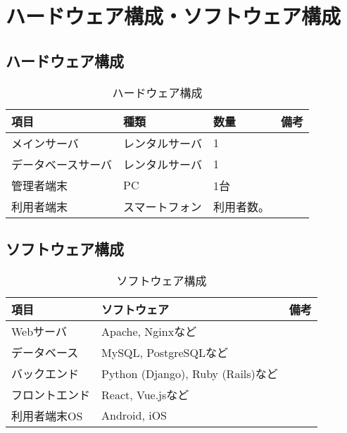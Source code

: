 \documentclass{docs}
\begin{document}
\section{ハードウェア構成・ソフトウェア構成}
\subsection{ハードウェア構成}
\begin{table}[H]
	\centering
	\caption{ハードウェア構成}
	\label{tab:hardware}
	\begin{tabularx}{0.9\textwidth}{|l|X|X|X|}
		\hline
		\textbf{項目} & \textbf{種類} & \textbf{数量} & \textbf{備考} \\ \hline
		メインサーバ & レンタルサーバ & 1 & \\ \hline
		データベースサーバ & レンタルサーバ & 1 & \\ \hline
		管理者端末 & PC & 1台 & \\ \hline
		利用者端末 & スマートフォン & 利用者数。 & \\ \hline
	\end{tabularx}
\end{table}

\subsection{ソフトウェア構成}
\begin{table}[H]
	\centering
	\caption{ソフトウェア構成}
	\label{tab:software}
	\begin{tabularx}{0.9\textwidth}{|l|X|X|}
		\hline
		\textbf{項目} & \textbf{ソフトウェア} & \textbf{備考} \\ \hline
		Webサーバ & Apache, Nginxなど & \\ \hline
		データベース & MySQL, PostgreSQLなど & \\ \hline
		バックエンド & Python (Django), Ruby (Rails)など & \\ \hline
		フロントエンド & React, Vue.jsなど & \\ \hline
		利用者端末OS & Android, iOS & \\ \hline
	\end{tabularx}
\end{table}

\end{document}
